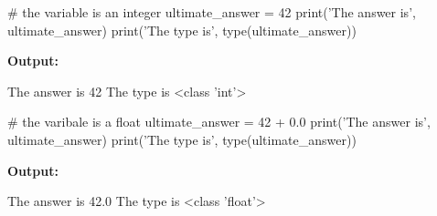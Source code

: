 \documentclass[
  american,
  ignorenonframetext,
]{beamer}
\newenvironment{pyexec}[1]{\noindent \textbf{Output: }  #1}{}
\begin{document}
\begin{frame}{}
\protect\hypertarget{section-2}{}

\begin{pythoncode}

# the variable is an integer
ultimate_answer = 42
print('The answer is', ultimate_answer)
print('The type is', type(ultimate_answer))

\end{pythoncode}

\begin{pyexec}

\begin{outputcode}

The answer is 42
The type is <class 'int'>

\end{outputcode}

\end{pyexec}

\end{frame}

\begin{frame}{}
\protect\hypertarget{section-3}{}

\begin{pythoncode}

# the varibale is a float
ultimate_answer = 42 + 0.0
print('The answer is', ultimate_answer)
print('The type is', type(ultimate_answer))

\end{pythoncode}

\begin{pyexec}

\begin{outputcode}

The answer is 42.0
The type is <class 'float'>

\end{outputcode}

\end{pyexec}


\end{frame}
\end{document}
